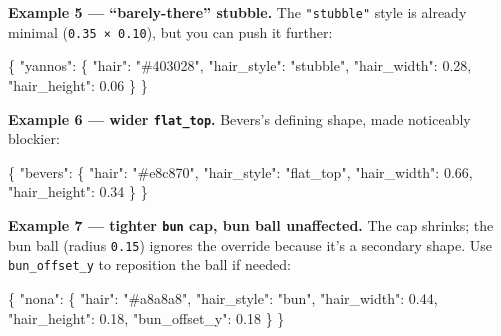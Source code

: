 \documentclass[
  11pt,
]{book}
\newenvironment{Shaded}{}{}
\newcommand{\DataTypeTok}[1]{\textcolor[rgb]{0.56,0.13,0.00}{#1}}
\newcommand{\FloatTok}[1]{\textcolor[rgb]{0.25,0.63,0.44}{#1}}
\newcommand{\FunctionTok}[1]{\textcolor[rgb]{0.02,0.16,0.49}{#1}}
\newcommand{\StringTok}[1]{\textcolor[rgb]{0.25,0.44,0.63}{#1}}
\begin{document}
\textbf{Example 5 --- ``barely-there'' stubble.} The
\texttt{"stubble"} style is already minimal (\texttt{0.35\ ×\ 0.10}),
but you can push it further:

\begin{Shaded}
\begin{Highlighting}[]
\FunctionTok{\{}
  \DataTypeTok{"yannos"}\FunctionTok{:} \FunctionTok{\{}
    \DataTypeTok{"hair"}\FunctionTok{:}        \StringTok{"\#403028"}\FunctionTok{,}
    \DataTypeTok{"hair\_style"}\FunctionTok{:}  \StringTok{"stubble"}\FunctionTok{,}
    \DataTypeTok{"hair\_width"}\FunctionTok{:}  \FloatTok{0.28}\FunctionTok{,}
    \DataTypeTok{"hair\_height"}\FunctionTok{:} \FloatTok{0.06}
  \FunctionTok{\}}
\FunctionTok{\}}
\end{Highlighting}
\end{Shaded}

\textbf{Example 6 --- wider \texttt{flat\_top}.} Bevers's defining
shape, made noticeably blockier:

\begin{Shaded}
\begin{Highlighting}[]
\FunctionTok{\{}
  \DataTypeTok{"bevers"}\FunctionTok{:} \FunctionTok{\{}
    \DataTypeTok{"hair"}\FunctionTok{:}        \StringTok{"\#e8c870"}\FunctionTok{,}
    \DataTypeTok{"hair\_style"}\FunctionTok{:}  \StringTok{"flat\_top"}\FunctionTok{,}
    \DataTypeTok{"hair\_width"}\FunctionTok{:}  \FloatTok{0.66}\FunctionTok{,}
    \DataTypeTok{"hair\_height"}\FunctionTok{:} \FloatTok{0.34}
  \FunctionTok{\}}
\FunctionTok{\}}
\end{Highlighting}
\end{Shaded}

\textbf{Example 7 --- tighter \texttt{bun} cap, bun ball
unaffected.} The cap shrinks; the bun ball (radius \texttt{0.15})
ignores the override because it's a secondary shape. Use
\texttt{bun\_offset\_y} to reposition the ball if needed:

\begin{Shaded}
\begin{Highlighting}[]
\FunctionTok{\{}
  \DataTypeTok{"nona"}\FunctionTok{:} \FunctionTok{\{}
    \DataTypeTok{"hair"}\FunctionTok{:}          \StringTok{"\#a8a8a8"}\FunctionTok{,}
    \DataTypeTok{"hair\_style"}\FunctionTok{:}    \StringTok{"bun"}\FunctionTok{,}
    \DataTypeTok{"hair\_width"}\FunctionTok{:}    \FloatTok{0.44}\FunctionTok{,}
    \DataTypeTok{"hair\_height"}\FunctionTok{:}   \FloatTok{0.18}\FunctionTok{,}
    \DataTypeTok{"bun\_offset\_y"}\FunctionTok{:}  \FloatTok{0.18}
  \FunctionTok{\}}
\FunctionTok{\}}
\end{Highlighting}
\end{Shaded}
\end{document}
